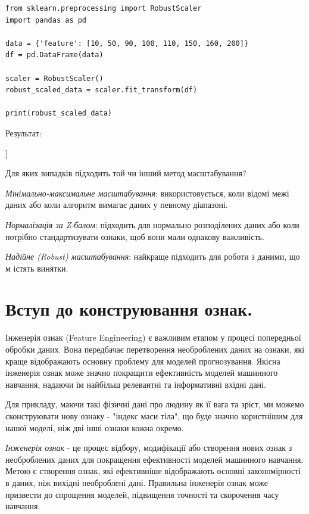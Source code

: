 \begin{lstlisting}
from sklearn.preprocessing import RobustScaler
import pandas as pd

data = {'feature': [10, 50, 90, 100, 110, 150, 160, 200]}
df = pd.DataFrame(data)

scaler = RobustScaler()
robust_scaled_data = scaler.fit_transform(df)

print(robust_scaled_data)
\end{lstlisting}

Результат:

\begin{console}
[[-1.42857143]
 [-0.85714286]
 [-0.28571429]
 [-0.14285714]
 [ 0.        ]
 [ 0.57142857]
 [ 0.71428571]
 [ 1.28571429]
 [34.14285714]]
\end{console}

 Для яких випадків підходить той чи інший метод масштабування?

\textit{Мінімально-максимальне масштабування}: використовується, коли відомі межі даних або коли 
алгоритм вимагає даних у певному діапазоні.

\textit{Нормалізація за Z-балом}: підходить для нормально розподілених даних або коли потрібно 
стандартизувати ознаки, щоб вони мали однакову важливість.

\textit{Надійне (Robust) масштабування}: найкраще підходить для роботи з даними, що м
істять винятки.



\section{Вступ до конструювання ознак.}

Інженерія ознак (Feature Engineering) є важливим етапом у процесі попередньої обробки даних. Вона передбачає перетворення 
необроблених даних на ознаки, які краще відображають основну проблему для моделей прогнозування. 
Якісна інженерія ознак може значно покращити ефективність моделей машинного навчання, надаючи їм 
найбільш релевантні та інформативні вхідні дані.

Для прикладу, маючи такі фізичні дані про людину як її вага та зріст, ми можемо 
сконструювати нову ознаку - "індекс маси тіла", що буде значно користнішим для нашої моделі,
ніж дві інші ознаки кожна окремо. 

\textit{Інженерія ознак} - це процес відбору, модифікації або створення нових ознак з необроблених даних 
для покращення ефективності моделей машинного навчання. Метою є створення ознак, які ефективніше 
відображають основні закономірності в даних, ніж вихідні необроблені дані. Правильна інженерія 
ознак може призвести до спрощення моделей, підвищення точності та скорочення часу навчання.

